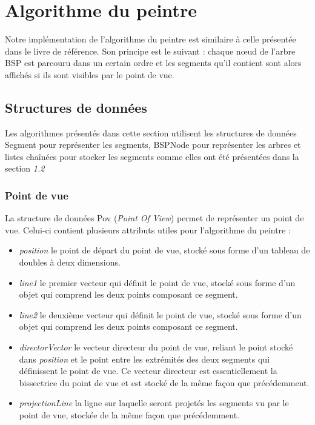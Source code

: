 \documentclass[11pt,a4paper]{article}
\theoremstyle{definition}
\theoremstyle{remark}
\begin{document}
\newpage

\section{Algorithme du peintre}

Notre implémentation de l'algorithme du peintre est similaire à celle présentée dans le livre de référence. Son principe est le suivant : chaque nœud de l'arbre BSP est parcouru dans un certain ordre et les segments qu'il contient sont alors affichés si ils sont visibles par le point de vue.

\subsection{Structures de données}
Les algorithmes présentés dans cette section utilisent les structures de données Segment pour représenter les segments, BSPNode pour représenter les arbres et listes chaînées pour stocker les segments comme elles ont été présentées dans la section \textit{1.2}

\subsubsection{Point de vue}
La structure de données Pov (\emph{Point Of View}) permet de représenter un point de vue. Celui-ci contient plusieurs attributs utiles pour l'algorithme du peintre :\\

\begin{itemize}
	\item \emph{position} le point de départ du point de vue, stocké sous forme d'un tableau de doubles à deux dimensions.
	\item \emph{line1} le premier vecteur qui définit le point de vue, stocké sous forme d'un objet qui comprend les deux points composant ce segment.
	\item \emph{line2} le deuxième vecteur qui définit le point de vue, stocké sous forme d'un objet qui comprend les deux points composant ce segment.
	\item \emph{directorVector} le vecteur directeur du point de vue, reliant le point stocké dans \emph{position} et le point entre les extrémités des deux segments qui définissent le point de vue. Ce vecteur directeur est essentiellement la bissectrice du point de vue et est stocké de la même façon que précédemment.
	\item \emph{projectionLine} la ligne sur laquelle seront projetés les segments vu par le point de vue, stockée de la même façon que précédemment.
\end{itemize}
\end{document}
